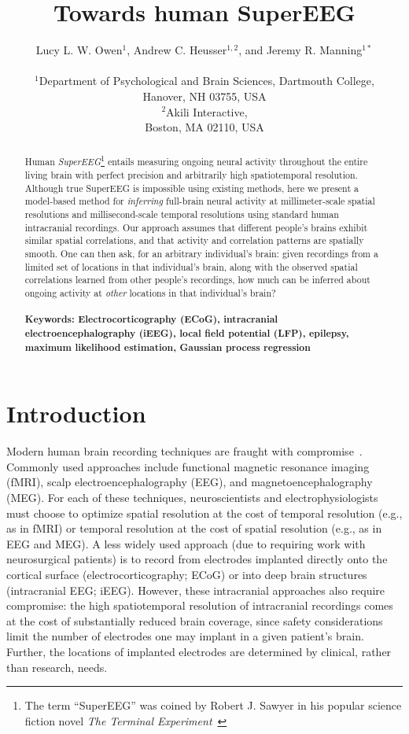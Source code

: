 \documentclass[11pt]{article}
\title{Towards human SuperEEG}
\author{
  Lucy L. W. Owen$^{1}$,
  Andrew C. Heusser$^{1, 2}$, and
  Jeremy R. Manning$^{1\ast}$\\\\
$^{1}$Department of Psychological and Brain Sciences, Dartmouth College,\\
Hanover, NH 03755, USA\\
$^{2}$Akili Interactive,\\
Boston, MA 02110, USA}
\date{}
\begin{document}
 

\baselineskip24pt
\maketitle 

\begin{abstract}
  Human \textit{SuperEEG}\footnote{The term ``SuperEEG'' was coined by
    Robert J. Sawyer in his popular science fiction novel \textit{The
      Terminal Experiment}~\cite{Sawy95}} entails measuring ongoing
  neural activity throughout the entire living brain with perfect
  precision and arbitrarily high spatiotemporal resolution.  Although
  true SuperEEG is impossible using existing methods, here we present
  a model-based method for \textit{inferring} full-brain neural
  activity at millimeter-scale spatial resolutions and
  millisecond-scale temporal resolutions using standard human
  intracranial recordings.  Our approach assumes that different
  people's brains exhibit similar spatial correlations, and that
  activity and correlation patterns are spatially smooth.  One can
  then ask, for an arbitrary individual's brain: given recordings from
  a limited set of locations in that individual's brain, along with
  the observed spatial correlations learned from other people's
  recordings, how much can be inferred about ongoing activity at
  \textit{other} locations in that
  individual's brain?\\\\
  \footnotesize{\textbf{Keywords: Electrocorticography (ECoG),
      intracranial electroencephalography (iEEG), local field
      potential (LFP), epilepsy, maximum likelihood estimation,
      Gaussian process regression}}
\end{abstract}

\section*{Introduction}
Modern human brain recording techniques are fraught with
compromise~\citep{SejnEtal14}.  Commonly used approaches include
functional magnetic resonance imaging (fMRI), scalp
electroencephalography (EEG), and magnetoencephalography (MEG).  For
each of these techniques, neuroscientists and electrophysiologists
must choose to optimize spatial resolution at the cost of temporal
resolution (e.g., as in fMRI) or temporal resolution at the cost of
spatial resolution (e.g., as in EEG and MEG).  A less widely used
approach (due to requiring work with neurosurgical patients) is to
record from electrodes implanted directly onto the cortical surface
(electrocorticography; ECoG) or into deep brain structures
(intracranial EEG; iEEG).  However, these intracranial approaches also
require compromise: the high spatiotemporal resolution of
intracranial recordings comes at the cost of substantially reduced
brain coverage, since safety considerations limit the number of
electrodes one may implant in a given patient's brain.  Further, the
locations of implanted electrodes are determined by clinical, rather
than research, needs.
\end{document}
